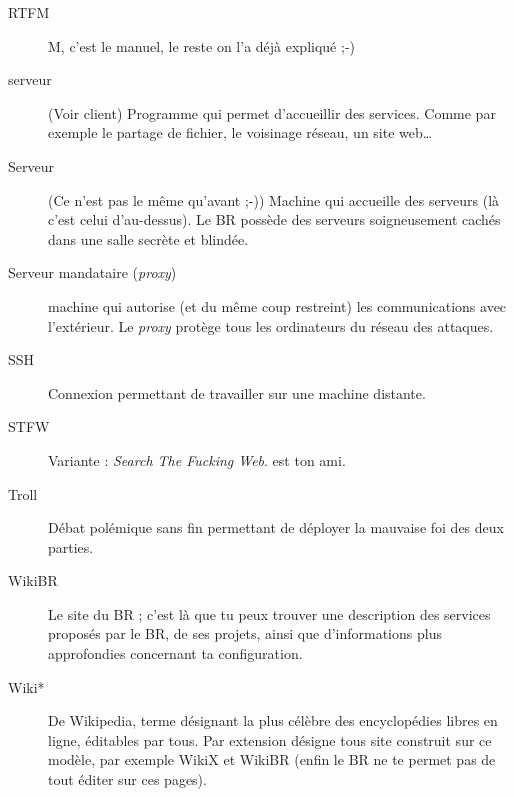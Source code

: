 \begin{description}
  \item[RTFM] M, c'est le manuel, le reste on l'a déjà expliqué ;-)
  \item[serveur] (Voir client) Programme qui permet d'accueillir des services. Comme par exemple le partage de fichier, le voisinage réseau, un site web\ldots\
  \item[Serveur] (Ce n'est pas le même qu'avant ;-)) Machine qui accueille des serveurs (là c'est celui d'au-dessus). Le BR possède des serveurs soigneusement cachés dans une salle secrète et blindée.
    \item[Serveur mandataire (\emph{proxy})] machine qui autorise (et du même coup restreint) les communications avec l'extérieur. Le \emph{proxy} protège tous les ordinateurs du réseau des attaques.
  \item[SSH] Connexion permettant de travailler sur une machine distante.
  \item[STFW] Variante : \emph{Search The Fucking Web}.  est ton ami.
  \item[Troll] Débat polémique sans fin permettant de déployer la mauvaise foi des deux parties.
  \item[WikiBR] Le site du BR ; c'est là que tu peux trouver une description des services proposés par le BR, de ses projets, ainsi que
  d'informations plus approfondies concernant ta configuration.
  \item[Wiki*] De Wikipedia, terme d\'esignant la plus c\'el\`ebre des encyclop\'edies libres en ligne, \'editables par tous. Par extension d\'esigne tous site construit sur ce mod\`ele, par exemple WikiX et WikiBR (enfin le BR ne te permet pas de tout \'editer sur ces pages).
\end{description}
